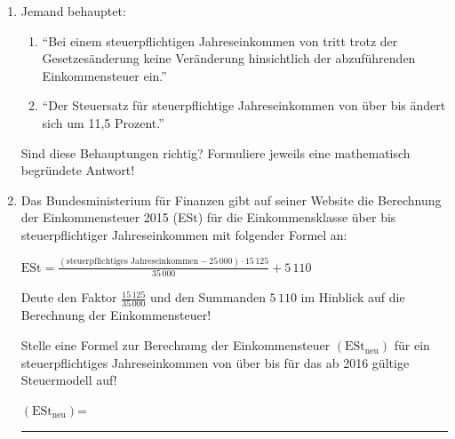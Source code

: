 \begin{langesbeispiel}
\begin{enumerate}
\item Jemand behauptet:
\begin{enumerate}
	\item "`Bei einem steuerpflichtigen Jahreseinkommen von  tritt trotz der Gesetzesänderung keine Veränderung hinsichtlich der abzuführenden Einkommensteuer ein."'
	
	\item "`Der Steuersatz für steuerpflichtige Jahreseinkommen von über  bis  ändert sich um 11,5 Prozent."'
\end{enumerate}
	
	Sind diese Behauptungen richtig? Formuliere jeweils eine mathematisch begründete Antwort!
	
	\item Das Bundesministerium für Finanzen gibt auf seiner Website die Berechnung der Einkommensteuer 2015 (ESt) für die Einkommensklasse über  bis  steuerpflichtiger Jahreseinkommen mit folgender Formel an:\leer
	
	$\text{ESt}=\frac{(\text{steuerpflichtiges Jahreseinkommen}-25\,000)\cdot 15\,125}{35\,000}+5\,110$\leer
	
	Deute den Faktor $\frac{15\,125}{35\,000}$ und den Summanden $5\,110$ im Hinblick auf die Berechnung der Einkommensteuer!\leer
	
	Stelle eine Formel zur Berechnung der Einkommensteuer $(\text{ESt}_\text{neu})$ für ein steuerpflichtiges Jahreseinkommen von über  bis  für das ab 2016 gültige Steuermodell auf!\leer
	
	$(\text{ESt}_\text{neu})$= \rule{5cm}{0.3pt}

						\end{enumerate}\leer
				
\end{langesbeispiel}
